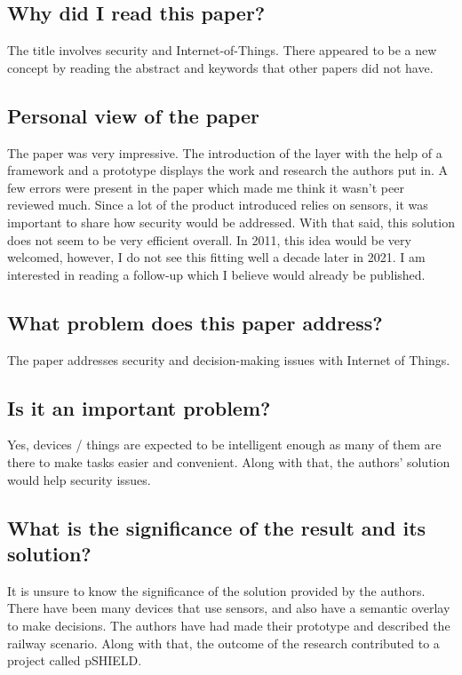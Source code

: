 \documentclass[11pt,a4paper]{article}
\begin{document}
\subsection*{Why did I read this paper?}
The title involves security and Internet-of-Things. There appeared to be a new concept by reading the abstract and keywords that other papers did not have. 

\subsection*{Personal view of the paper}
The paper was very impressive. The introduction of the layer with the help of a framework and a prototype displays the work and research the authors put in. A few errors were present in the paper which made me think it wasn’t peer reviewed much. Since a lot of the product introduced relies on sensors, it was important to share how security would be addressed. With that said, this solution does not seem to be very efficient overall. In 2011, this idea would be very welcomed, however, I do not see this fitting well a decade later in 2021. I am interested in reading a follow-up which I believe would already be published.

\subsection*{What problem does this paper address?}
The paper addresses security and decision-making issues with Internet of Things. 

\subsection*{Is it an important problem?}
Yes, devices / things are expected to be intelligent enough as many of them are there to make tasks easier and convenient. Along with that, the authors’ solution would help security issues. 

\subsection*{What is the significance of the result and its solution?}
It is unsure to know the significance of the solution provided by the authors. There have been many devices that use sensors, and also have a semantic overlay to make decisions. The authors have had made their prototype and described the railway scenario. Along with that, the outcome of the research contributed to a project called pSHIELD. 
\end{document}
